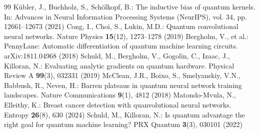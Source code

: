 \documentclass[runningheads]{llncs}
\begin{document}
\begin{thebibliography}{99}
 K{\"u}bler, J., Buchholz, S., Sch{\"o}lkopf, B.: The inductive bias of quantum kernels. In: Advances in Neural Information Processing Systems (NeurIPS), vol. 34, pp. 12661--12673 (2021)
 Cong, I., Choi, S., Lukin, M.D.: Quantum convolutional neural networks. Nature Physics \textbf{15}(12), 1273--1278 (2019)
 Bergholm, V., et al.: PennyLane: Automatic differentiation of quantum machine learning circuits. arXiv:1811.04968 (2018)
 Schuld, M., Bergholm, V., Gogolin, C., Izaac, J., Killoran, N.: Evaluating analytic gradients on quantum hardware. Physical Review A \textbf{99}(3), 032331 (2019)
 McClean, J.R., Boixo, S., Smelyanskiy, V.N., Babbush, R., Neven, H.: Barren plateaus in quantum neural network training landscapes. Nature Communications \textbf{9}(1), 4812 (2018)
 Matondo-Mvula, N., Elleithy, K.: Breast cancer detection with quanvolutional neural networks. Entropy \textbf{26}(8), 630 (2024)
 Schuld, M., Killoran, N.: Is quantum advantage the right goal for quantum machine learning? PRX Quantum \textbf{3}(3), 030101 (2022)
\end{thebibliography}
\end{document}
